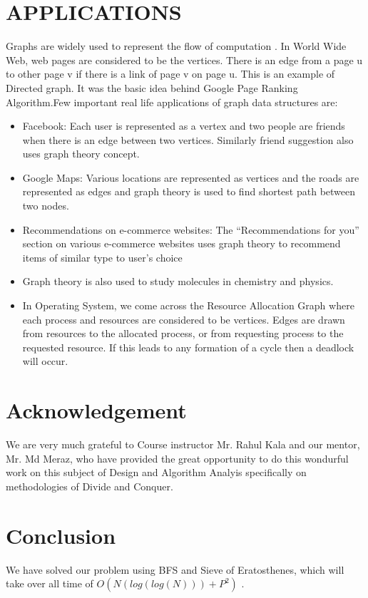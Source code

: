 \documentclass[conference]{IEEEtran}
\begin{document}
\section{APPLICATIONS}
Graphs are widely used to represent the flow of computation .
In World Wide Web, web pages are considered to be the vertices. There is an edge from a page u to other page v if there is a link of page v on page u. This is an example of Directed graph. It was the basic idea behind Google Page Ranking Algorithm.Few important real life applications of graph data structures are:

\begin{itemize}
    \item Facebook: Each user is represented as a vertex and two people are friends when there is an edge between two vertices. Similarly friend suggestion also uses graph theory concept.
     \item Google Maps: Various locations are represented as vertices and the roads are represented as edges and graph theory is used to find shortest path between two nodes.
\item Recommendations on e-commerce websites: The “Recommendations for you” section on various e-commerce websites uses graph theory to recommend items of similar type to user’s choice
\item Graph theory is also used to study molecules in chemistry and physics.
\item In Operating System, we come across the Resource Allocation Graph where each process and resources are considered to be vertices. Edges are drawn from resources to the allocated process, or from requesting process to the requested resource. If this leads to any formation of a cycle then a deadlock will occur.
\end{itemize}


\section{Acknowledgement}
We are very much grateful to Course instructor Mr. Rahul Kala and our mentor, Mr. Md Meraz, who have provided the great opportunity to do this wondurful work on this subject of Design and Algorithm Analyis specifically on methodologies of Divide and Conquer.

\section{Conclusion}
We have solved our problem using BFS and Sieve of Eratosthenes,
which will take over all time of $O(N(log(log(N))) + P^2)$ .
\end{document}
